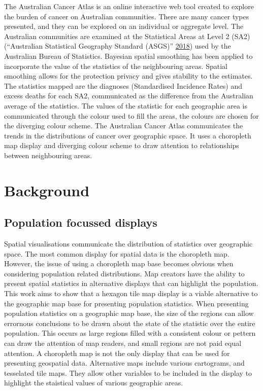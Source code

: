 \documentclass[conference,final,]{IEEEtran}
\begin{document}
The Australian Cancer Atlas is an online interactive web tool created to
explore the burden of cancer on Australian communities. There are many
cancer types presented, and they can be explored on an individual or
aggregate level. The Australian communities are examined at the
Statistical Areas at Level 2 (SA2) (``Australian Statistical Geography
Standard (ASGS)'' \protect\hyperlink{ref-abs2016}{2018}) used by the
Australian Bureau of Statistics. Bayesian spatial smoothing has been
applied to incorporate the value of the statistics of the neighbouring
areas. Spatial smoothing allows for the protection privacy and gives
stability to the estimates. The statistics mapped are the diagnoses
(Standardised Incidence Rates) and excess deaths for each SA2,
communicated as the difference from the Australian average of the
statistics. The values of the statistic for each geographic area is
communicated through the colour used to fill the areas, the colours are
chosen for the diverging colour scheme. The Australian Cancer Atlas
communicates the trends in the distributions of cancer over geographic
space. It uses a choropleth map display and diverging colour scheme to
draw attention to relationships between neighbouring areas.

\hypertarget{background}{%
\section{Background}\label{background}}

\hypertarget{population-focussed-displays}{%
\subsection{Population focussed
displays}\label{population-focussed-displays}}

Spatial visualisations communicate the distribution of statistics over
geographic space. The most common display for spatial data is the
choropleth map. However, the issue of using a choropleth map base
becomes obvious when considering population related distributions. Map
creators have the ability to present spatial statistics in alternative
displays that can highlight the population. This work aims to show that
a hexagon tile map display is a viable alternative to the geographic map
base for presenting population statistics. When presenting population
statistics on a geographic map base, the size of the regions can allow
errornous conclusions to be drawn about the state of the statistic over
the entire population. This occurs as large regions filled with a
consistent colour or pettern can draw the attention of map readers, and
small regions are not paid equal attention. A choropleth map is not the
only display that can be used for presenting geospatial data.
Alternative maps include various cartograms, and tesselated tile maps.
They allow other variables to be included in the display to highlight
the staistical values of various geographic areas.
\end{document}
